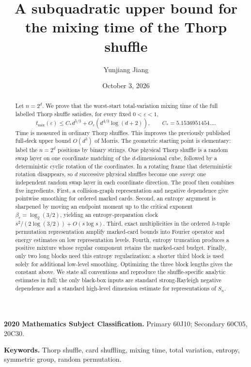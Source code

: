 \documentclass[11pt]{article}
\title{A subquadratic upper bound for the mixing time of the Thorp shuffle}
\author{Yunjiang Jiang}
\date{October 3, 2026}
\numberwithin{equation}{section}
\theoremstyle{definition}\newtheorem{definition}[theorem]{Definition}
\theoremstyle{remark}\newtheorem{remark}[theorem]{Remark}
\begin{document}
\maketitle

\begin{abstract}
Let $n=2^d$.  We prove that the worst-start total-variation mixing time of the
full labelled Thorp shuffle satisfies, for every fixed $0<\varepsilon<1$,
\[
 t_{\mathrm{mix}}(\varepsilon)
 \le C_* d^{5/3}+O_\varepsilon\!\left(d^{4/3}\log(d+2)\right),
 \qquad C_*=5.1536951454\ldots .
\]
Time is measured in ordinary Thorp shuffles.  This improves the previously
published full-deck upper bound $O(d^3)$ of Morris.  The geometric starting
point is elementary: label the $n=2^d$ positions by binary strings.  One
physical Thorp shuffle is a random swap layer on one coordinate matching of
the $d$-dimensional cube, followed by a deterministic cyclic rotation of the
coordinates.  In a rotating frame that deterministic rotation disappears, so
$d$ successive physical shuffles become one \emph{sweep}: one independent
random swap layer in each coordinate direction.  The proof then combines five
ingredients.  First, a collision-graph representation and negative dependence
give pointwise smoothing for ordered marked cards.  Second, an entropy argument
is sharpened by moving an endpoint moment up to the critical exponent
$\beta_c=\log_2(3/2)$, yielding an entropy-preparation clock
$s^2/(2\log(3/2))+O(s\log s)$.  Third, exact multiplicities in the ordered
$h$-tuple permutation representation amplify marked-card bounds into Fourier
operator and energy estimates on low representation levels.  Fourth, entropy
truncation produces a positive mixture whose regular component retains the
marked-card budget.  Finally, only two long blocks need this entropy
regularization: a shorter third block is used solely for additional low-level
smoothing.  Optimizing the three block lengths gives the constant above.  We
state all conventions and reproduce the shuffle-specific analytic estimates in
full; the only black-box inputs are standard strong-Rayleigh negative
dependence and a standard high-level dimension estimate for representations of
$S_n$.
\end{abstract}

\noindent\textbf{2020 Mathematics Subject Classification.} Primary 60J10; Secondary 60C05, 20C30.

\noindent\textbf{Keywords.} Thorp shuffle, card shuffling, mixing time, total variation, entropy, symmetric group, random permutation.
\end{document}
